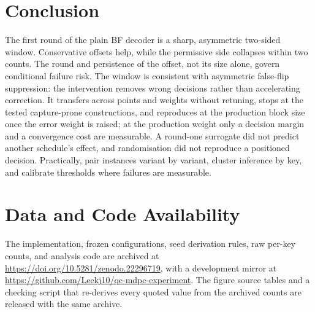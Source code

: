\documentclass[lettersize,journal]{IEEEtran}
\begin{document}
\section{Conclusion}\label{sec:conclusion}

The first round of the plain BF decoder is a sharp, asymmetric two-sided window. Conservative offsets help, while the permissive side collapses within two counts. The round and persistence of the offset, not its size alone, govern conditional failure risk. The window is consistent with asymmetric false-flip suppression: the intervention removes wrong decisions rather than accelerating correction. It transfers across points and weights without retuning, stops at the tested capture-prone constructions, and reproduces at the production block size once the error weight is raised; at the production weight only a decision margin and a convergence cost are measurable. A round-one surrogate did not predict another schedule's effect, and randomisation did not reproduce a positioned decision. Practically, pair instances variant by variant, cluster inference by key, and calibrate thresholds where failures are measurable.
\section*{Data and Code Availability}
The implementation, frozen configurations, seed derivation rules, raw per-key counts, and analysis code are archived at \url{https://doi.org/10.5281/zenodo.22296719}, with a development mirror at \url{https://github.com/Leekj10/qc-mdpc-experiment}. The figure source tables and a checking script that re-derives every quoted value from the archived counts are released with the same archive.



\end{document}
